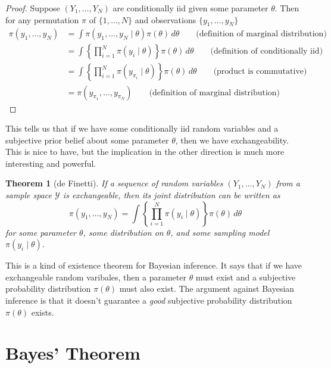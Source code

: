 \documentclass[
]{book}
\newtheorem{theorem}{Theorem}[chapter]
\theoremstyle{definition}
\theoremstyle{definition}
\theoremstyle{definition}
\theoremstyle{definition}
\theoremstyle{remark}
\begin{document}
\begin{proof}
Suppose \((Y_1, \ldots, Y_N)\) are conditionally iid given some parameter \(\theta\). Then for any permutation \(\pi\) of \(\{1, \ldots, N\}\) and observations \(\{y_1, \ldots, y_N\}\)
\begin{equation}
\begin{split}
\pi(y_1, \ldots, y_N) &= \int \pi(y_1, \ldots, y_N \mid \theta) \pi(\theta)\, d\theta \qquad \textrm{(definition of marginal distribution)}\\
 & = \int \left\{\prod_{i=1}^N\pi(y_i \mid \theta)\right\} \pi(\theta)\, d\theta \qquad \textrm{(definition of conditionally iid)}\\
& = \int \left\{\prod_{i=1}^N\pi(y_{\pi_i} \mid \theta)\right\} \pi(\theta)\, d\theta \qquad \textrm{(product is commutative)} \\
 & = \pi(y_{\pi_1}, \ldots, y_{\pi_N}) \qquad \textrm{(definition of marginal distribution)}
\end{split}
\end{equation}
\end{proof}

This tells us that if we have some conditionally iid random variables and a subjective prior belief about some parameter \(\theta\), then we have exchangeability. This is nice to have, but the implication in the other direction is much more interesting and powerful.

\begin{theorem}[de Finetti]
If a sequence of random variables \((Y_1, \ldots, Y_N)\) from a sample space \(\mathcal{Y}\) is exchangeable, then its joint distribution can be written as
\[
\pi(y_1, \ldots, y_N) = \int \left\{\prod_{i=1}^N\pi(y_i \mid \theta)\right\} \pi(\theta)\, d\theta
\]
for some parameter \(\theta\), some distribution on \(\theta\), and some sampling model \(\pi(y_i \mid \theta)\).
\end{theorem}

This is a kind of existence theorem for Bayesian inference. It says that if we have exchangeable random varibales, then a parameter \(\theta\) must exist and a subjective probability distribution \(\pi(\theta)\) must also exist. The argument against Bayesian inference is that it doesn't guarantee a \emph{good} subjective probability distribution \(\pi(\theta)\) exists.

\hypertarget{bayes-theorem}{%
\section{Bayes' Theorem}\label{bayes-theorem}}
\end{document}
